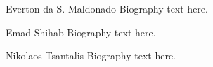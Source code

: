 \documentclass[10pt,journal,compsoc]{IEEEtran}
\begin{document}


\ifCLASSOPTIONcaptionsoff
  \newpage
\fi



 

% 

\begin{IEEEbiography}{Everton da S. Maldonado}
Biography text here.
\end{IEEEbiography}

\begin{IEEEbiography}{Emad Shihab}
Biography text here.
\end{IEEEbiography}

\begin{IEEEbiography}{Nikolaos Tsantalis}
Biography text here.
\end{IEEEbiography}

\clearpage





\end{document}
